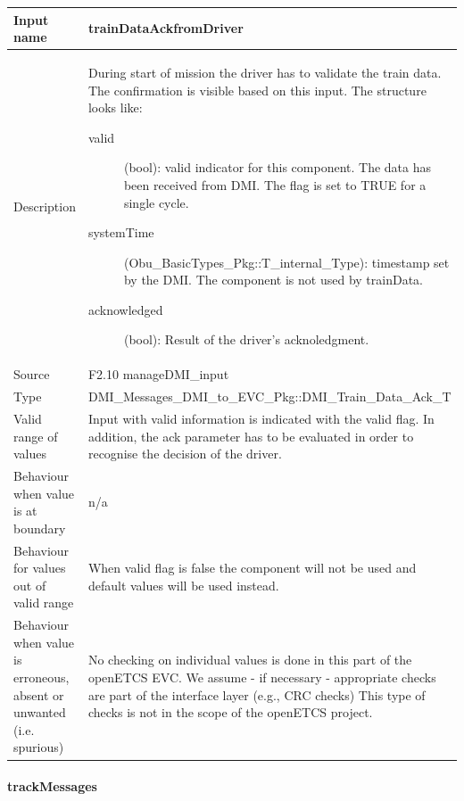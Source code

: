 \begin{longtable}{p{}p{}}
\toprule
Input name				& trainDataAckfromDriver \\
\midrule
Description				& During start of mission the driver has to validate the train data. The confirmation is visible  based on this input. The structure looks like:
\begin{description}
\item[valid](bool): valid indicator for this component. The data has been received from DMI. The flag is set to TRUE for a single cycle. 
\item[systemTime](Obu\_BasicTypes\_Pkg::T\_internal\_Type): timestamp set by the DMI. The component is not used by trainData.
\item[acknowledged](bool): Result of the driver's acknoledgment.
\end{description} \\
\midrule
Source					& F2.10 manageDMI\_input\\ 
\midrule
Type					& DMI\_Messages\_DMI\_to\_EVC\_Pkg::DMI\_Train\_Data\_Ack\_T \\
\midrule
Valid range of values	& Input with valid information is indicated with the valid flag. In addition, the ack parameter has to be evaluated in order to recognise the decision of the driver.\\
\midrule
Behaviour when value is at boundary	& n/a\\
\midrule
Behaviour for values out of valid range	& When valid flag is false the component will not be used and default values will be used instead.\\
\midrule
Behaviour when value is erroneous, absent or unwanted (i.e. spurious) & No checking on individual values is done in this part of the openETCS EVC. We assume - if necessary - appropriate checks are part of the interface layer (e.g., CRC checks) This type of checks is not in the scope of the openETCS project.\\

\bottomrule
\end{longtable}
\paragraph{trackMessages}

